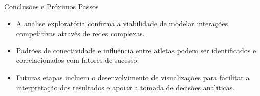 \begin{frame}{Conclusões e Próximos Passos}
\begin{itemize}
    \item A análise exploratória confirma a viabilidade de modelar interações competitivas através de redes complexas.
    \item Padrões de conectividade e influência entre atletas podem ser identificados e correlacionados com fatores de sucesso.
    \item Futuras etapas incluem o desenvolvimento de visualizações para facilitar a interpretação dos resultados e apoiar a tomada de decisões analiticas.
\end{itemize}
\end{frame}

